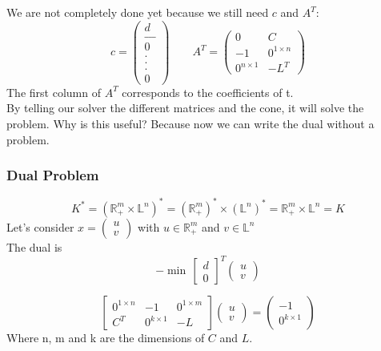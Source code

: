 We are not completely done yet because we still need $c$ and $A^T$:\\
$$c = \begin{pmatrix}
d\\
\_ \_ \_ \\
0\\
. \\
. \\
. \\
0
\end{pmatrix} \qquad A^T= \begin{pmatrix}
0 & C\\
-1 & 0^{1\times n}\\
0^{n\times 1} & -L^T
\end{pmatrix}
$$
The first column of $A^T$ corresponds to the coefficients of t. \\

By telling our solver the different matrices and the cone, it will solve the problem. Why is this useful? Because now we can write the dual without a problem.

\subsubsection{Dual Problem}
$$K^*= (\mathbb{R}^m_+ \times \mathbb{L}^n)^*= (\mathbb{R}^m_+)^* \times (\mathbb{L}^n)^*= \mathbb{R}^m_+ \times \mathbb{L}^n = K$$
Let's consider $x= \begin{pmatrix}
u \\
v
\end{pmatrix} $ with $u \in \mathbb{R}^m_+$ and $v \in \mathbb{L}^n$\\
The dual is 
$$-\min \, \begin{bmatrix}
d \\
0
\end{bmatrix}^T \begin{pmatrix}
u\\
v
\end{pmatrix} $$

\begin{equation}
\begin{bmatrix}
0^{1\times n} & -1 & 0^{1\times m}\\
C^T & 0^{k\times 1} & -L
\end{bmatrix}\begin{pmatrix}
u\\
v
\end{pmatrix}=
\begin{pmatrix}
-1\\
0^{k\times 1}
\end{pmatrix}
\end{equation}
Where n, m and k are the dimensions of $C$ and $L$.
 
